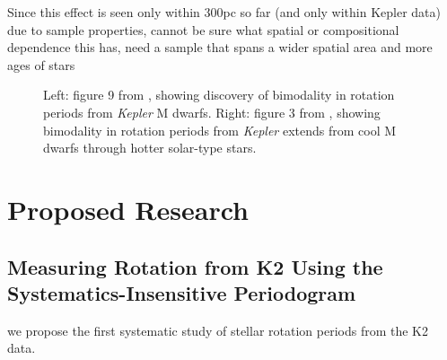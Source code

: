 \documentclass[12pt]{article}
\newcommand{\Kepler}{\textsl{Kepler}\xspace}
\begin{document}
 Since this effect is seen only within 300pc so far (and only within Kepler data) due to sample properties, cannot be sure what spatial or compositional dependence this has, need a sample that spans a wider spatial area and more ages of stars

\begin{figure}[!th]
\centering
{}
\caption{
Left: figure 9 from \citet{mcquillan2013}, showing discovery of bimodality in rotation periods from \Kepler M dwarfs.
Right: figure 3 from \citet{davenport2017}, showing bimodality in rotation periods from \Kepler extends from cool M dwarfs through hotter solar-type stars.
}
\label{fig:bimodal}
\end{figure}



\section{Proposed Research} 
\subsection{Measuring Rotation from K2 Using the Systematics-Insensitive Periodogram }
we propose the first systematic study of stellar rotation periods from the K2 data. 
\end{document}
